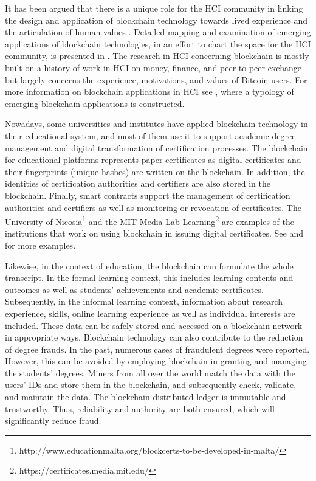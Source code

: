 \documentclass[manuscript,review,anonymous]{acmart}%
\begin{document}
It has been argued that there is a unique role for the HCI community in linking the design and application of blockchain technology towards lived
experience and the articulation of human values \cite{els}. Detailed mapping and examination of
emerging applications of blockchain technologies, in an
effort to chart the space for the HCI community, is presented in \cite{els}.
The research in HCI concerning blockchain is mostly built on a history of
work in HCI on money, finance, and peer-to-peer exchange \cite{bel, car, fer, kay,lam, mil,shi} but largely concerns the
experience, motivations, and values of Bitcoin users. For more information on blockchain applications in HCI see \cite{els}, where a typology of emerging blockchain applications is constructed.


Nowadays, some universities and institutes have applied blockchain technology in their educational system, and most of them use it to support academic degree management and digital transformation of certification processes. The blockchain for educational platforms represents paper certificates as digital certificates and their fingerprints (unique hashes) are written on the blockchain. In addition, the identities of certification authorities and certifiers are also stored in the blockchain. Finally, smart contracts support the management of certification authorities and certifiers as well as monitoring or revocation of certificates.
The University of Nicosia\footnote{http://www.educationmalta.org/blockcerts-to-be-developed-in-malta/} and the MIT Media Lab Learning\footnote{https://certificates.media.mit.edu/} are examples of the institutions that work on using blockchain in issuing digital certificates.
See \cite{chen} and \cite{gra} for more examples.


Likewise, in the context of education, the blockchain can formulate the whole transcript. In the formal learning context, this includes learning contents and outcomes as well as students' achievements and academic certificates. Subsequently, in the informal learning context, information about research experience, skills, online learning experience as well as individual interests are included. These data can be safely stored and accessed on a blockchain network in appropriate ways.
Blockchain technology can also contribute to the reduction of degree frauds. In the past, numerous cases of fraudulent degrees were reported. However, this can be avoided by employing blockchain in granting and managing the students' degrees. Miners from all over the world match the data with the users' IDs and store them in the blockchain, and subsequently check, validate, and maintain the data. The blockchain distributed ledger is immutable and trustworthy. Thus, reliability and authority are both ensured, which will significantly reduce fraud.
\end{document}
